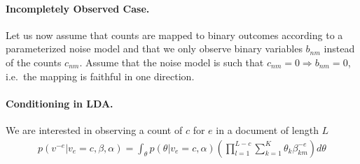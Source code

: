 \documentclass{article}
\begin{document}
\paragraph{Incompletely Observed  Case.} Let us now assume that counts are mapped to binary outcomes according to a parameterized noise model and that we only observe binary variables $b_{nm}$ instead of the counts $c_{nm}$. Assume that the noise model is such that $c_{nm}=0 \Rightarrow b_{nm}=0$, i.e.~the mapping is faithful in one direction. 

\newpage



\paragraph{Conditioning in LDA.} We are interested in observing a count of $c$ for $e$ in a document of length $L$
\begin{align}
p(v^{-e}| v_e=c, \beta, \alpha) = 
\int_\theta p(\theta | v_e=c, \alpha ) \left( \prod_{l=1}^{L-c} \sum_{k=1}^K \theta_k \beta^{-e}_{km}  \right) d\theta
\end{align}


\maketitle 
\end{document}
